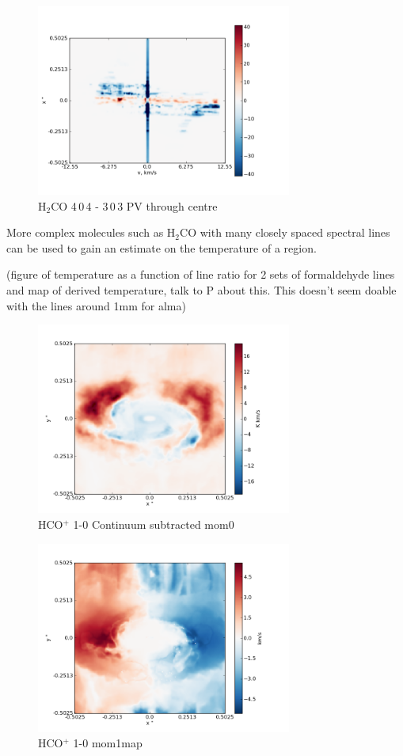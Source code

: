 \documentclass[useAMS,usenatbib]{mn2e}
\begin{document}
\begin{figure}
 \includegraphics[width=84mm]{Figures/sim/imageH2CO_4-0-4->3-0-3_30deg_PV_centre.png}

 \caption{H$_2$CO 4$\,$0$\,$4 - 3$\,$0$\,$3 PV through centre}
\end{figure}

More complex molecules such as H$_2$CO with many closely spaced spectral lines can be used to gain an estimate on the temperature of a region. 

(figure of temperature as a function of line ratio for 2 sets of formaldehyde lines and map of derived temperature, talk to P about this. This doesn't seem doable with the lines around 1mm for alma)\newline

\begin{figure}
 \includegraphics[width=84mm]{Figures/sim/imageHCOp_1-0_30deg_contSub.png}

 \caption{HCO$^+$ 1-0 Continuum subtracted mom0}
\end{figure}

\begin{figure}
 \includegraphics[width=84mm]{Figures/sim/imageHCOp_1-0_30deg_mom1.png}

 \caption{HCO$^+$ 1-0 mom1map}
\end{figure}
\end{document}
